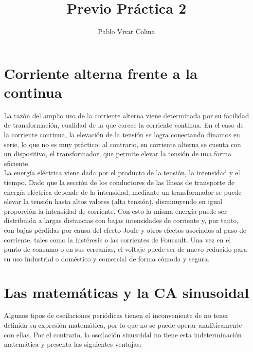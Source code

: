 \documentclass{article}
\title{Previo Práctica 2}
\author{Pablo Vivar Colina \\

}
\begin{document}
\maketitle

\section{Corriente alterna frente a la continua}

La razón del amplio uso de la corriente alterna viene determinada por su facilidad de transformación, cualidad de la que carece la corriente continua. En el caso de la corriente continua, la elevación de la tensión se logra conectando dínamos en serie, lo que no es muy práctico; al contrario, en corriente alterna se cuenta con un dispositivo, el transformador, que permite elevar la tensión de una forma eficiente.\citep{CA}\\

La energía eléctrica viene dada por el producto de la tensión, la intensidad y el tiempo. Dado que la sección de los conductores de las líneas de transporte de energía eléctrica depende de la intensidad, mediante un transformador se puede elevar la tensión hasta altos valores (alta tensión), disminuyendo en igual proporción la intensidad de corriente. Con esto la misma energía puede ser distribuida a largas distancias con bajas intensidades de corriente y, por tanto, con bajas pérdidas por causa del efecto Joule y otros efectos asociados al paso de corriente, tales como la histéresis o las corrientes de Foucault. Una vez en el punto de consumo o en sus cercanías, el voltaje puede ser de nuevo reducido para su uso industrial o doméstico y comercial de forma cómoda y segura.\citep{CA}\\


\section{Las matemáticas y la CA sinusoidal}

Algunos tipos de oscilaciones periódicas tienen el inconveniente de no tener definida su expresión matemática, por lo que no se puede operar analíticamente con ellas. Por el contrario, la oscilación sinusoidal no tiene esta indeterminación matemática y presenta las siguientes ventajas:\citep{CA}\\
\end{document}
